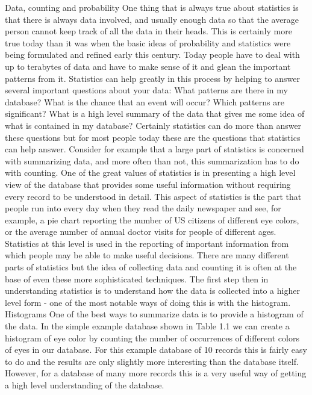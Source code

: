 Data, counting and probability
One thing that is always true about statistics is that  there is always data involved,  and usually enough data so that the average person cannot keep track of all the data in their heads.   This is certainly more true today than it was when the basic ideas of probability and statistics were being formulated and refined early this century.  Today people have to deal with up to terabytes of data and have to make sense of it and glean the important patterns from it.  Statistics can help greatly in this process by helping to answer several important questions about your data:
What patterns are there in my database? 
What is the chance that an event will occur? 
Which patterns are significant? 
What is a high level summary of the data that gives me some idea of what is contained in my database? 
Certainly statistics can do more than answer these questions but for most people today these are the questions that statistics can help answer.  Consider for example that a large part of statistics is concerned with summarizing data, and more often than not, this summarization has to do with counting.   One of the great values of statistics is in presenting a high level view of the database that provides some useful information without requiring every record to be understood in detail.  This aspect of statistics is the part that people run into every day when they read the daily newspaper and see, for example, a pie chart reporting the number of US citizens of different eye colors, or the average number of annual doctor visits for people of different ages.   Statistics at this level is used in the reporting of important information from which people may be able to make useful decisions.   There are many different parts of statistics but the idea of collecting data and counting it is often at the base of even these more sophisticated techniques.  The first step then in understanding statistics is to understand how the data is collected into a  higher level form - one of the most notable ways of doing this is with the histogram.
Histograms
One of the best ways to summarize data is to provide a histogram of the data.  In the simple example database shown in Table 1.1 we can create a histogram of eye color by counting the number of occurrences of different colors of eyes in our database.  For this example database of 10 records this is fairly easy to do and the results are only slightly more interesting than the database itself.   However, for a database of many more records this is a very useful way of getting a high level understanding of the database.
